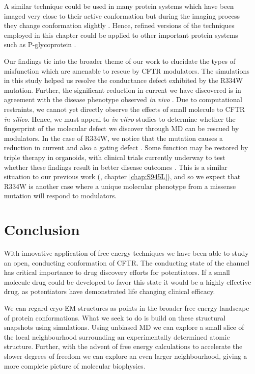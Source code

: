A similar technique could be used in many protein systems which have been imaged very close to their active conformation but during the imaging process they change conformation slightly \cite{bock2022}. Hence, refined versions of the techniques employed in this chapter could be applied to other important protein systems such as P-glycoprotein \cite{}.  %

Our findings tie into the broader theme of our work to elucidate the types of misfunction which are amenable to rescue by CFTR modulators. The simulations in this study helped us resolve the conductance defect exhibited by the R334W mutation. Further, the significant reduction in current we have discovered is in agreement with the disease phenotype observed \textit {in vivo} \cite{}. Due to computational restraints, we cannot yet directly observe the effects of small molecule to CFTR \textit{in silico}. Hence, we must appeal to \textit{in vitro} studies to determine whether the fingerprint of the molecular defect we discover through MD can be rescued by modulators. In the case of R334W, we notice that the mutation causes a reduction in current and also a gating defect \cite{}. Some function may be restored by triple therapy in organoids, with clinical trials currently underway to test whether these findings result in better disease outcomes \cite{}. This is a similar situation to our previous work (\cite{wong2022a, wong2022}, chapter \ref{chap:S945L}), and so we expect that R334W is another case where a unique molecular phenotype from a missense mutation will respond to modulators.

\section{Conclusion}
With innovative application of free energy techniques we have been able to study an open, conducting conformation of CFTR. The conducting state of the channel has critical importance to drug discovery efforts for potentiators. If a small molecule drug could be developed to favor this state it would be a highly effective drug, as potentiators have demonstrated life changing clinical efficacy.

We can regard cryo-EM structures as points in the broader free energy landscape of protein conformations. What we seek to do is build on these structural snapshots using simulations. Using unbiased MD we can explore a small slice of the local neighbourhood surrounding an experimentally determined atomic structure. Further, with the advent of free energy calculations to accelerate the slower degrees of freedom we can explore an even larger neighbourhood, giving a more complete picture of molecular biophysics. 

